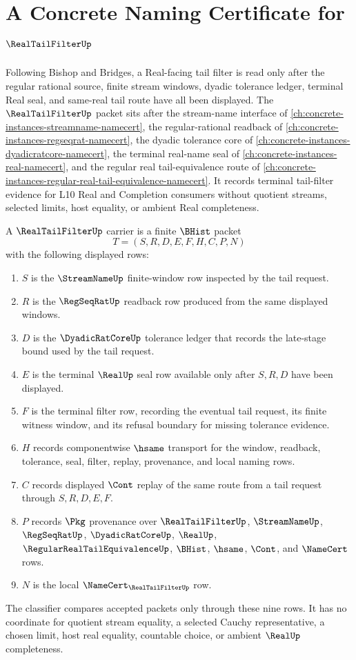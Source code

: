 \chapter{A Concrete Naming Certificate for $\RealTailFilterUp$}
\label{ch:concrete-instances-real-tail-filter-namecert}

Following Bishop and Bridges, a Real-facing tail filter is read only after the regular rational source, finite stream windows, dyadic tolerance ledger, terminal Real seal, and same-real tail route have all been displayed. The $\RealTailFilterUp$ packet sits after the stream-name interface of \autoref{ch:concrete-instances-streamname-namecert}, the regular-rational readback of \autoref{ch:concrete-instances-regseqrat-namecert}, the dyadic tolerance core of \autoref{ch:concrete-instances-dyadicratcore-namecert}, the terminal real-name seal of \autoref{ch:concrete-instances-real-namecert}, and the regular real tail-equivalence route of \autoref{ch:concrete-instances-regular-real-tail-equivalence-namecert}. It records terminal tail-filter evidence for L10 Real and Completion consumers without quotient streams, selected limits, host equality, or ambient Real completeness.

\begin{definition}
\label{def:real-tail-filter-carrier}
A $\RealTailFilterUp$ carrier is a finite $\BHist$ packet
$$
T=(S,R,D,E,F,H,C,P,N)
$$
with the following displayed rows:
\begin{enumerate}
\item $S$ is the $\StreamNameUp$ finite-window row inspected by the tail request.
\item $R$ is the $\RegSeqRatUp$ readback row produced from the same displayed windows.
\item $D$ is the $\DyadicRatCoreUp$ tolerance ledger that records the late-stage bound used by the tail request.
\item $E$ is the terminal $\RealUp$ seal row available only after $S,R,D$ have been displayed.
\item $F$ is the terminal filter row, recording the eventual tail request, its finite witness window, and its refusal boundary for missing tolerance evidence.
\item $H$ records componentwise $\hsame$ transport for the window, readback, tolerance, seal, filter, replay, provenance, and local naming rows.
\item $C$ records displayed $\Cont$ replay of the same route from a tail request through $S,R,D,E,F$.
\item $P$ records $\Pkg$ provenance over $\RealTailFilterUp$, $\StreamNameUp$, $\RegSeqRatUp$, $\DyadicRatCoreUp$, $\RealUp$, $\RegularRealTailEquivalenceUp$, $\BHist$, $\hsame$, $\Cont$, and $\NameCert$ rows.
\item $N$ is the local $\NameCert_{\RealTailFilterUp}$ row.
\end{enumerate}
The classifier compares accepted packets only through these nine rows. It has no coordinate for quotient stream equality, a selected Cauchy representative, a chosen limit, host real equality, countable choice, or ambient $\RealUp$ completeness.
\end{definition}

